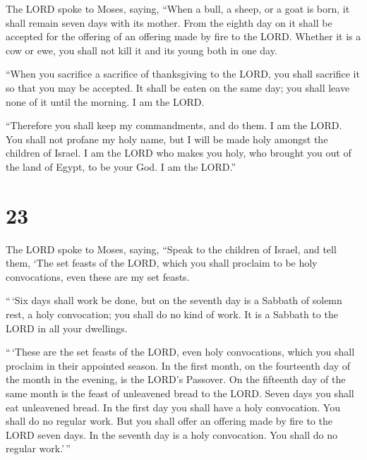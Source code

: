  The LORD spoke to Moses, saying,  ``When a
bull, a sheep, or a goat is born, it shall remain seven days with its
mother. From the eighth day on it shall be accepted for the offering of
an offering made by fire to the LORD.  Whether it is a cow
or ewe, you shall not kill it and its young both in one day.

 ``When you sacrifice a sacrifice of thanksgiving to the
LORD, you shall sacrifice it so that you may be accepted. 
It shall be eaten on the same day; you shall leave none of it until the
morning. I am the LORD.

 ``Therefore you shall keep my commandments, and do them. I
am the LORD.  You shall not profane my holy name, but I
will be made holy amongst the children of Israel. I am the LORD who
makes you holy,  who brought you out of the land of Egypt,
to be your God. I am the LORD.''

\hypertarget{section-22}{%
\section{23}\label{section-22}}

 The LORD spoke to Moses, saying,  ``Speak to
the children of Israel, and tell them, `The set feasts of the LORD,
which you shall proclaim to be holy convocations, even these are my set
feasts.

 ``\,`Six days shall work be done, but on the seventh day is
a Sabbath of solemn rest, a holy convocation; you shall do no kind of
work. It is a Sabbath to the LORD in all your dwellings.

 ``\,`These are the set feasts of the LORD, even holy
convocations, which you shall proclaim in their appointed season.
 In the first month, on the fourteenth day of the month in
the evening, is the LORD's Passover.  On the fifteenth day
of the same month is the feast of unleavened bread to the LORD. Seven
days you shall eat unleavened bread.  In the first day you
shall have a holy convocation. You shall do no regular work.
 But you shall offer an offering made by fire to the LORD
seven days. In the seventh day is a holy convocation. You shall do no
regular work.'\,''

